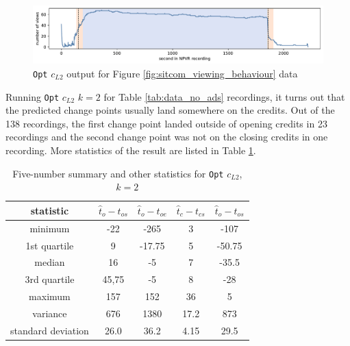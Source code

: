 \begin{figure}[h]
  \centering
  \includegraphics[width=1\textwidth]{../plots/sitcom-pelt_l2_pen30000.pdf}
  \caption{\texttt{Opt} $c_{L2}$ output for Figure \ref{fig:sitcom_viewing_behaviour} data}
  \label{fig:opt_sitcom}
\end{figure}

Running \texttt{Opt} $c_{L2}$ $k=2$ for Table \ref{tab:data_no_ads} recordings, it turns out that the predicted change points usually land somewhere on the credits. Out of the 138 recordings, the first change point landed outside of opening credits in 23 recordings
and the second change point was not on the closing credits in one recording. More statistics of the result are listed in Table \ref{tab:statistics_opt}.


\begin{table}[h]
    \begin{center}
    \begin{tabular}{|c|c|c|c|c|}%
        \hline
        \textbf{statistic} & $\hat{t}_o-t_{os}$ & $\hat{t}_o-t_{oe}$ & $\hat{t}_c-t_{cs}$ & $\hat{t}_o-t_{os}$  \\ \hline
        minimum & -22 & -265 & 3 & -107\\ \hline
        1st quartile & 9 & -17.75 & 5 & -50.75\\ \hline
        median & 16 & -5 & 7 & -35.5\\ \hline
        3rd quartile & 45,75 & -5 & 8 & -28 \\ \hline
        maximum & 157 & 152	& 36 & 5\\ \hline
        variance & 676 & 1380	& 17.2 & 873\\ \hline
        standard deviation & 26.0 & 36.2 & 4.15 & 29.5\\ \hline
    \end{tabular}
    \end{center}
    \caption{Five-number summary and other statistics for \texttt{Opt} $c_{L2}$, $k=2$}
    \label{tab:statistics_opt}
\end{table}

